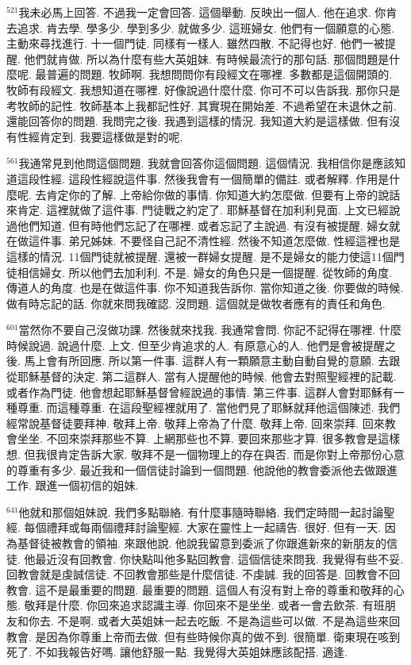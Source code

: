 \documentclass{book}
\begin{document}
$^{521}$我未必馬上回答.
不過我一定會回答.
這個舉動.
反映出一個人.
他在追求.
你肯去追求.
肯去學.
學多少.
學到多少.
就做多少.
這班婦女.
他們有一個願意的心態.
主動來尋找進行.
十一個門徒.
同樣有一樣人.
雖然四散.
不記得也好.
他們一被提醒.
他們就肯做.
所以為什麼有些大英姐妹.
有時候最流行的那句話.
那個問題是什麼呢.
最普遍的問題.
牧師啊.
我想問問你有段經文在哪裡.
多數都是這個開頭的.
牧師有段經文.
我想知道在哪裡.
好像說過什麼什麼.
你可不可以告訴我.
那你只是考牧師的記性.
牧師基本上我都記性好.
其實現在開始差.
不過希望在未退休之前.
還能回答你的問題.
我問完之後.
我遇到這樣的情況.
我知道大約是這樣做.
但有沒有性經肯定到.
我要這樣做是對的呢.

$^{561}$我通常見到他問這個問題.
我就會回答你這個問題.
這個情況.
我相信你是應該知道這段性經.
這段性經說這件事.
然後我會有一個簡單的備註.
或者解釋.
作用是什麼呢.
去肯定你的了解.
上帝給你做的事情.
你知道大約怎麼做.
但要有上帝的說話來肯定.
這裡就做了這件事.
門徒戰之約定了.
耶穌基督在加利利見面.
上文已經說過他們知道.
但有時他們忘記了在哪裡.
或者忘記了主說過.
有沒有被提醒.
婦女就在做這件事.
弟兄姊妹.
不要怪自己記不清性經.
然後不知道怎麼做.
性經這裡也是這樣的情況.
11個門徒就被提醒.
還被一群婦女提醒.
是不是婦女的能力使這11個門徒相信婦女.
所以他們去加利利.
不是.
婦女的角色只是一個提醒.
從牧師的角度.
傳道人的角度.
也是在做這件事.
你不知道我告訴你.
當你知道之後.
你要做的時候.
做有時忘記的話.
你就來問我確認.
沒問題.
這個就是做牧者應有的責任和角色.

$^{601}$當然你不要自己沒做功課.
然後就來找我.
我通常會問.
你記不記得在哪裡.
什麼時候說過.
說過什麼.
上文.
但至少肯追求的人.
有原意心的人.
他們是會被提醒之後.
馬上會有所回應.
所以第一件事.
這群人有一顆願意主動自動自覺的意願.
去跟從耶穌基督的決定.
第二這群人.
當有人提醒他的時候.
他會去對照聖經裡的記載.
或者作為門徒.
他會想起耶穌基督曾經說過的事情.
第三件事.
這群人會對耶穌有一種尊重.
而這種尊重.
在這段聖經裡就用了.
當他們見了耶穌就拜他這個陳述.
我們經常說基督徒要拜神.
敬拜上帝.
敬拜上帝為了什麼.
敬拜上帝.
回來崇拜.
回來教會坐坐.
不回來崇拜那些不算.
上網那些也不算.
要回來那些才算.
很多教會是這樣想.
但我很肯定告訴大家.
敬拜不是一個物理上的存在與否.
而是你對上帝那份心意的尊重有多少.
最近我和一個信徒討論到一個問題.
他說他的教會委派他去做跟進工作.
跟進一個初信的姐妹.

$^{641}$他就和那個姐妹說.
我們多點聯絡.
有什麼事隨時聯絡.
我們定時間一起討論聖經.
每個禮拜或每兩個禮拜討論聖經.
大家在靈性上一起禱告.
很好.
但有一天.
因為基督徒被教會的領袖.
來跟他說.
他說我留意到委派了你跟進新來的新朋友的信徒.
他最近沒有回教會.
你快點叫他多點回教會.
這個信徒來問我.
我覺得有些不妥.
回教會就是虔誠信徒.
不回教會那些是什麼信徒.
不虔誠.
我的回答是.
回教會不回教會.
這不是最重要的問題.
最重要的問題.
這個人有沒有對上帝的尊重和敬拜的心態.
敬拜是什麼.
你回來追求認識主導.
你回來不是坐坐.
或者一會去飲茶.
有班朋友和你去.
不是啊.
或者大英姐妹一起去吃飯.
不是為這些可以做.
不是為這些來回教會.
是因為你尊重上帝而去做.
但有些時候你真的做不到.
很簡單.
衛東現在咳到死了.
不如我報告好嗎.
讓他舒服一點.
我覺得大英姐妹應該配搭.
適逢.
\end{document}
